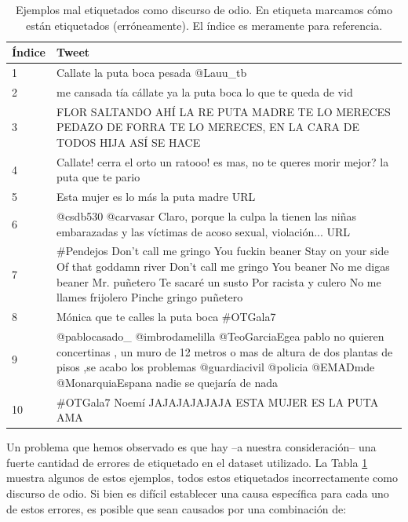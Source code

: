 \begin{table}[t]
    \centering
    \begin{tabularx}{\textwidth}{l X}
        Índice &  Tweet \\
        \hline
        \rule{0pt}{3ex}1 &Callate la puta boca pesada @Lauu\_tb \\
        \rule{0pt}{3ex}2 & me cansada tía cállate ya la puta boca lo que te queda de vid \\
        \rule{0pt}{3ex}3   & FLOR SALTANDO AHÍ LA RE PUTA MADRE TE LO MERECES PEDAZO DE FORRA TE LO MERECES, EN LA CARA DE TODOS HIJA ASÍ SE HACE \\
        \rule{0pt}{3ex}4   & Callate! cerra el orto un ratooo! es mas, no te queres morir mejor? la puta que te pario  \\
        \rule{0pt}{3ex}5   & Esta mujer es lo más la puta madre URL\\
        \rule{0pt}{3ex}6   & @csdb530 @carvasar Claro, porque la culpa la tienen las niñas embarazadas y las víctimas de acoso sexual, violación... URL \\
        \rule{0pt}{3ex}7   & \#Pendejos Don't call me gringo You fuckin beaner Stay on your side Of that goddamn river Don't call me gringo You beaner No me digas beaner Mr. puñetero Te sacaré un susto Por racista y culero No me llames frijolero Pinche gringo puñetero \\
        \rule{0pt}{3ex}8   & Mónica que te calles la puta boca \#OTGala7 \\
        \rule{0pt}{3ex}9   & @pablocasado\_ @imbrodamelilla @TeoGarciaEgea pablo no quieren concertinas , un muro de 12 metros o mas de altura de dos plantas de pisos ,se acabo los problemas @guardiacivil @policia @EMADmde @MonarquiaEspana nadie se quejaría de nada \\
        \rule{0pt}{3ex}10   & \#OTGala7 Noemí JAJAJAJAJAJA ESTA MUJER ES LA PUTA AMA \\
        \hline
    \end{tabularx}
    \caption{Ejemplos mal etiquetados como discurso de odio. En etiqueta marcamos cómo están etiquetados (erróneamente). El índice es meramente para referencia.}
    \label{tab:hateval_label_errors}
\end{table}


Un problema que hemos observado es que hay --a nuestra consideración-- una fuerte cantidad de errores de etiquetado en el dataset utilizado. La Tabla \ref{tab:hateval_label_errors} muestra algunos de estos ejemplos, todos estos etiquetados incorrectamente como discurso de odio. Si bien es difícil establecer una causa específica para cada uno de estos errores, es posible que sean causados por una combinación de:

